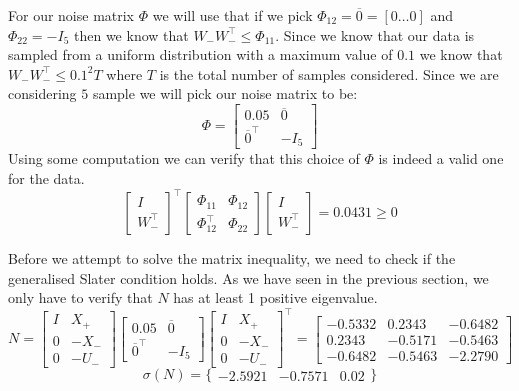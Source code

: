 For our noise matrix $\Phi$ we will use that if we pick $\Phi_{12} = \overline{0} = [0 \dots 0]$ and $\Phi_{22} = -I_5$ then we know that $W_- W_-^\top \leq \Phi_{11}$. Since we know that our data is sampled from a uniform distribution with a maximum value of $0.1$ we know that $W_- W_-^\top \leq 0.1^2 T$ where $T$ is the total number of samples considered. Since we are considering $5$ sample we will pick our noise matrix to be:
\begin{equation*}
	\Phi = \begin{bmatrix} 0.05 & \overline{0} \\ \overline{0}^\top & -I_5 \end{bmatrix}
\end{equation*}
Using some computation we can verify that this choice of $\Phi$ is indeed a valid one for the data.
\begin{equation}
\begin{bmatrix} I \\ W_-^\top \end{bmatrix} ^\top
\begin{bmatrix} \Phi_{11} & \Phi_{12} \\ \Phi_{12}^\top & \Phi_{22} \end{bmatrix}
\begin{bmatrix} I \\ W_-^\top \end{bmatrix} = 0.0431 \geq 0
\end{equation}

Before we attempt to solve the matrix inequality, we need to check if the generalised Slater condition holds. As we have seen in the previous section, we only have to verify that $N$ has at least 1 positive eigenvalue.
\begin{equation*}
 N = 
 \begin{bmatrix} I&X_+ \\ 0 & -X_- \\ 0&-U_- \end{bmatrix}
 \begin{bmatrix} 0.05 & \overline{0} \\ \overline{0}^\top & -I_5 \end{bmatrix}
 \begin{bmatrix} I&X_+ \\ 0 & -X_- \\ 0&-U_- \end{bmatrix}^\top 
 =
 \begin{bmatrix} 
 -0.5332 &  0.2343 & -0.6482\\
  0.2343 & -0.5171 & -0.5463 \\
 -0.6482 & -0.5463 & -2.2790
 \end{bmatrix} 
\end{equation*}
\begin{equation*}
 \sigma(N) = \{ \begin{array}{ccc}
 -2.5921 & -0.7571 & 0.02
 \end{array} \}
\end{equation*}

